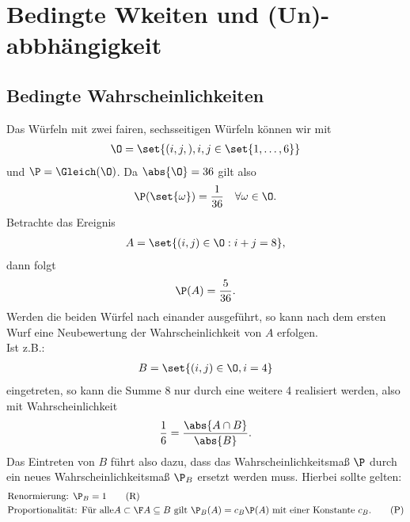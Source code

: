 \chapter[Bedingte Wahrscheinlichkeiten und (Un)-abbhängigkeit]{Bedingte Wkeiten und (Un)-abbhängigkeit}

\section{Bedingte Wahrscheinlichkeiten}
\begin{example}
	Das Würfeln mit zwei fairen, sechsseitigen Würfeln können wir mit 
	\begin{align}
		\O = \set{(i,j,), i,j \in \set{1,\dots,6}}\notag
	\end{align}
	und $\P = \Gleich(\O)$. Da $\abs{\O} = 36$ gilt also
	\begin{align}
		\P(\set{\omega}) = \frac{1}{36} \quad \forall \omega \in \O.\notag
	\end{align}
	Betrachte das Ereignis
	\begin{align}
		A = \set{(i,j) \in \O : i + j = 8},\notag
	\end{align}
	dann folgt
	\begin{align}
		\P(A) = \frac{5}{36}.\notag
	\end{align}
	Werden die beiden Würfel nach einander ausgeführt, so kann nach dem ersten Wurf eine Neubewertung der Wahrscheinlichkeit von $A$ erfolgen.\\
	Ist z.B.:
	\begin{align}
		B = \set{(i,j) \in \O, i = 4}\notag
	\end{align}
	eingetreten, so kann die Summe 8 nur durch eine weitere 4 realisiert werden, also mit Wahrscheinlichkeit
	\begin{align}
		\frac{1}{6} = \frac{\abs{A \cap B}}{\abs{B}}.\notag 
	\end{align}
	Das Eintreten von $B$ führt also dazu, dass das Wahrscheinlichkeitsmaß $\P$ durch ein neues Wahrscheinlichkeitsmaß $\P_{B}$ ersetzt werden muss. Hierbei sollte gelten:
	\begin{align}
		 &\text{Renormierung: }\P_{B} = 1\label{Renorm}\tag{R}\\
		 &\text{Proportionalität: Für alle} A \subset \F \mit A \subseteq B \text{ gilt }
		 \P_{B}(A) = c_B \P(A) \text{ mit einer Konstante } c_B.\label{Prop}\tag{P}
    \end{align}
\end{example}

